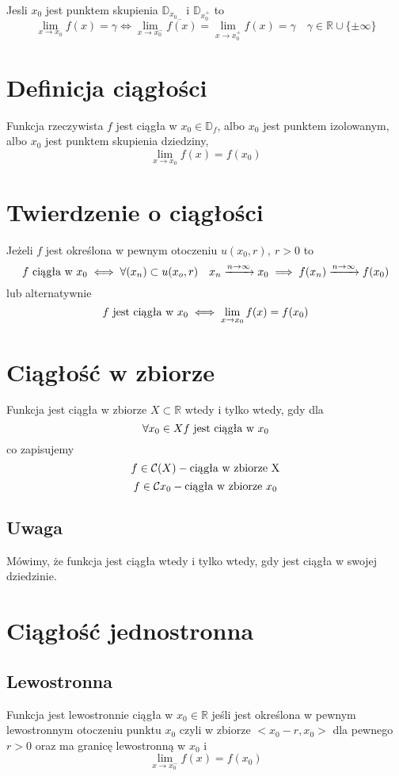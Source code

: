\documentclass[11pt]{article}
\begin{document}
Jesli $x_0$ jest punktem skupienia $\mathbb{D}_{{x_0}_-}$ i $\mathbb{D}_{x_0^+}$
to $$ \lim_{x \to x_0}{f(x)} = \gamma \iff \lim_{x \to x_0^-}{f(x)} = \lim_{x \to x_0^+}{f(x)} = \gamma \quad \gamma \in \mathbb{R} \cup \{\pm \infty\}$$

\section{Definicja ciągłości}
Funkcja rzeczywista $f$ jest ciągła w $x_0 \in \mathbb{D}_f$, albo $x_0$ jest punktem izolowanym, albo $x_0$ jest punktem skupienia dziedziny, $$ \lim_{x \to x_0}{f(x)} = f(x_0) $$

\section{Twierdzenie o ciągłości}
Jeżeli $f$ jest określona w pewnym otoczeniu $u(x_0,r), \ r >0$ to $$f \hbox{ ciągła w }x_0\iff \forall (x_n) \subset u(x_o,r)\quad x_n \xrightarrow{n \to \infty} x_0 \implies f(x_n) \xrightarrow{n \to \infty} f(x_0)$$
lub alternatywnie
$$f \hbox{ jest ciągła w }x_0 \iff \lim_{x \to x_0}{f(x)} = f(x_0) $$

\section{Ciągłość w zbiorze}
Funkcja jest ciągła w zbiorze $X \subset \mathbb{R}$ wtedy i tylko wtedy, gdy dla $$ \forall x_0 \in X {f \hbox{ jest ciągła w }x_0}$$ co zapisujemy
$$ f \in \mathcal{C}(X) - \hbox{ciągła w zbiorze X}$$
$$ f \in \mathcal{C}{x_0} - \hbox{ciągła w zbiorze }x_0$$

\subsection{Uwaga}
Mówimy, że funkcja jest ciągła wtedy i tylko wtedy, gdy jest ciągła w swojej dziedzinie.

\section{Ciągłość jednostronna}
\subsection{Lewostronna}
Funkcja jest lewostronnie ciągła w $x_0 \in \mathbb{R}$ jeśli jest określona w pewnym lewostronnym otoczeniu punktu $x_0$ czyli w zbiorze $<x_0 - r,x_0>$ dla pewnego $r >0$ oraz ma granicę lewostronną w $x_0$ i $$\lim_{x \to x_0^-} f(x) = f(x_0)$$
\end{document}
